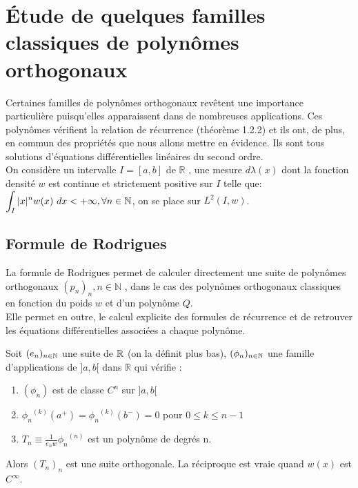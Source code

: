\chapter{\'{E}tude de quelques familles classiques de polynômes orthogonaux}

Certaines familles de polynômes orthogonaux revêtent une importance particulière puisqu'elles apparaissent dans de nombreuses applications. Ces polynômes vérifient la relation de récurrence (théorème 1.2.2) et ils ont, de plus, en commun des propriétés que nous allons mettre en évidence. Ils sont tous solutions d'équations différentielles linéaires du second ordre.
\\On considère un intervalle $I = [a, b]$ de $\mathbb{R}$ , une mesure $d\lambda (x)$ dont la fonction densité $w$ est continue et strictement positive sur $I$ telle que: $\displaystyle{\int_I{|x|^n w(x)\ dx} < +\infty, \forall n \in \N}$, on se place sur $L^2(I,w)$.

\section{Formule de Rodrigues}
La formule de Rodrigues permet de calculer directement une suite de polynômes orthogonaux ${(p_n)}_n, n\in\mathbb{N}$ , dans le cas des polynômes orthogonaux classiques en fonction du poids $w$ et d'un polynôme $Q$.
\\Elle permet en outre, le calcul explicite des formules de récurrence et de retrouver les équations différentielles associées a chaque polynôme.

\bthm
$ $\\Soit $(e_n)_{ n \in \mathbb N } $ une suite de $\mathbb R$ (on la définit plus bas), $(\phi_n)_{ n \in \mathbb N }$ une famille d'applications de $]a, b[$ dans $\mathbb{R}$ qui vérifie :
\begin{enumerate}
\item $ (\phi_n)$ est de classe $C^n$ sur $]a, b[$
\item $ {\phi_n}^{(k)} (a^+) = {\phi_n}^{(k)} (b^-) = 0$ pour $ 0 \leqslant k \leqslant n-1$
\item $ T_n \equiv \frac{1}{ e_n w}{{\phi_n}^{(n)}}$ est un polynôme de degrés n.
\end{enumerate}
Alors $(T_n)_n$ est une suite orthogonale.
La réciproque est vraie quand $w(x)$ est $C^\infty$.
\ethm


